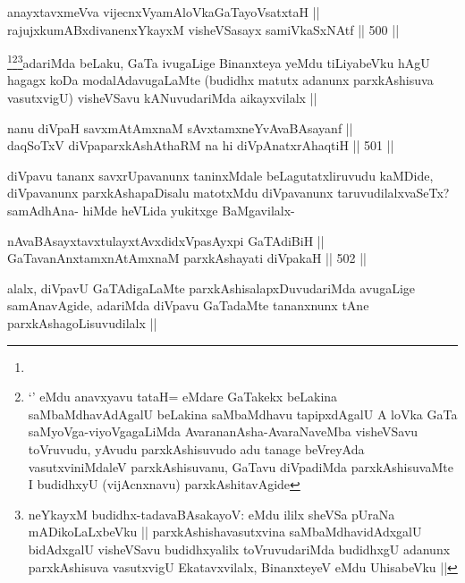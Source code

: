 
\begin{shl}
anayxtavxmeVva vijecnxVyamAloVkaGaTayoVsatxtaH || \\
rajujxkumABxdivanenxYkayxM visheVSasayx samiVkaSxNAtf ||  500 ||  
\end{shl}

\begin{artha}
\footnote{ }\footnote{`\stext' eMdu anavxyavu tataH= eMdare GaTakekx beLakina saMbaMdhavAdAgalU beLakina saMbaMdhavu tapipxdAgalU A loVka GaTa saMyoVga-viyoVgagaLiMda AvarananAsha-AvaraNaveMba visheVSavu toVruvudu, yAvudu parxkAshisuvudo adu tanage beVreyAda vasutxviniMdaleV parxkAshisuvanu, GaTavu diVpadiMda parxkAshisuvaMte I budidhxyU (vijAcnxnavu) parxkAshitavAgide }\footnote{neYkayxM budidhx-tadavaBAsakayoV: eMdu ililx sheVSa pUraNa mADikoLaLxbeVku || parxkAshishavasutxvina saMbaMdhavidAdxgalU bidAdxgalU visheVSavu budidhxyalilx toVruvudariMda budidhxgU adanunx parxkAshisuva vasutxvigU Ekatavxvilalx, BinanxteyeV eMdu UhisabeVku ||}adariMda beLaku, GaTa ivugaLige Binanxteya yeMdu tiLiyabeVku hAgU hagagx koDa modalAdavugaLaMte (budidhx matutx adanunx parxkAshisuva vasutxvigU) visheVSavu kANuvudariMda aikayxvilalx ||
\end{artha}


\begin{shl}
nanu diVpaH savxmAtAmxnaM sAvxtamxneYvAvaBAsayanf || \\
daqSoTxV diVpaparxkAshAthaRM na hi diVpAnatxrAhaqtiH ||  501 ||  
\end{shl}

\begin{artha}
diVpavu tananx savxrUpavanunx taninxMdale beLagutatxliruvudu kaMDide, diVpavanunx parxkAshapaDisalu matotxMdu diVpavanunx taruvudilalxvaSeTx? samAdhAna- hiMde heVLida yukitxge BaMgavilalx-
\end{artha}

\begin{shl}
nAvaBAsayxtavxtulayxtAvxdidxVpasAyxpi GaTAdiBiH ||  \\
GaTavanAnx\s \s tamxnA\s \s tAmxnaM parxkAshayati diVpakaH ||  502 ||  
\end{shl}

\begin{artha}
alalx, diVpavU GaTAdigaLaMte parxkAshisalapxDuvudariMda avugaLige samAnavAgide, adariMda diVpavu GaTadaMte tananxnunx tAne parxkAshagoLisuvudilalx ||
\end{artha}

